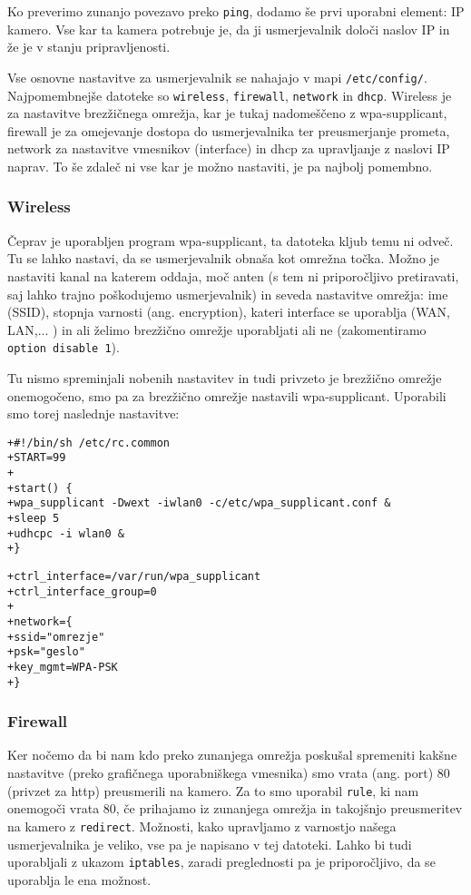 \documentclass[a4paper, 12pt]{book}
\begin{document}
Ko  preverimo zunanjo povezavo preko {\tt ping}, dodamo še prvi uporabni element: IP kamero. Vse kar ta kamera potrebuje je, da ji usmerjevalnik določi naslov IP in že je v stanju pripravljenosti.

Vse osnovne nastavitve za usmerjevalnik se nahajajo v mapi {\tt /etc/con\-fig/}. Naj\-pomembnejše datoteke so {\tt wireless}, {\tt firewall}, {\tt network} in {\tt dhcp}. Wireless je za nastavitve brezžičnega omrežja, kar je tukaj nadomeščeno z wpa-supplicant, firewall je za omejevanje dostopa do usmerjevalnika ter preusmerjanje prometa, network za nastavitve vmesnikov (interface) in dhcp za upravljanje z naslovi IP naprav. To še zdaleč ni vse kar je možno nastaviti, je pa najbolj pomembno.
\subsubsection{Wireless}
Čeprav je uporabljen program wpa-supplicant, ta datoteka kljub temu ni odveč. Tu se lahko nastavi, da se usmerjevalnik obnaša kot omrežna točka. Možno je nastaviti kanal na katerem oddaja, moč anten (s tem ni priporočljivo pretiravati, saj lahko trajno poškodujemo usmerjevalnik) in seveda nastavitve omrežja: ime (SSID), stopnja varnosti (ang. encryption), kateri interface se uporablja (WAN, LAN,... ) in ali želimo brezžično omrežje uporabljati ali ne (zakomentiramo {\tt option disable 1}).

Tu nismo spreminjali nobenih nastavitev in tudi privzeto je brezžično omrežje onemogočeno, smo pa za brezžično omrežje nastavili wpa-supplicant.
Uporabili smo torej naslednje nastavitve:
\begin{lstlisting}[caption=/etc/init.d/wpa\_supplicant]
+#!/bin/sh /etc/rc.common
+START=99
+
+start() {
+wpa_supplicant -Dwext -iwlan0 -c/etc/wpa_supplicant.conf &
+sleep 5
+udhcpc -i wlan0 &
+}
\end{lstlisting}

\begin{lstlisting}[caption=/etc/wpa\_supplicant.conf]
+ctrl_interface=/var/run/wpa_supplicant
+ctrl_interface_group=0
+
+network={
+ssid="omrezje"
+psk="geslo"
+key_mgmt=WPA-PSK
+}
\end{lstlisting}
\subsubsection{Firewall}
Ker nočemo da bi nam kdo preko zunanjega omrežja poskušal spremeniti kakšne nastavitve (preko grafičnega uporabniškega vmesnika) smo vrata (ang. port) 80 (privzet za http) preusmerili na kamero. Za to smo uporabil {\tt rule}, ki nam onemogoči vrata 80, če prihajamo iz zunanjega omrežja in takojšnjo preusmeritev na kamero z {\tt redirect}. Možnosti, kako upravljamo z varnostjo našega usmerjevalnika je veliko, vse pa je napisano v tej datoteki. Lahko bi tudi uporabljali z ukazom {\tt iptables}, zaradi preglednosti pa je priporočljivo, da se uporablja le ena možnost. 
\end{document}
